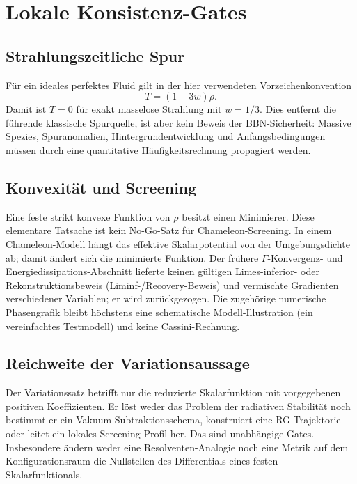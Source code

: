 \documentclass[12pt,a4paper]{article}
\theoremstyle{definition}
\theoremstyle{plain}
\theoremstyle{remark}
\begin{document}
\section{Lokale Konsistenz-Gates}

\subsection{Strahlungszeitliche Spur}\label{sec:BBN}

Für ein ideales perfektes Fluid gilt in der hier verwendeten
Vorzeichenkonvention
\[
 T=(1-3w)\rho .
\]
Damit ist \(T=0\) für exakt masselose Strahlung mit \(w=1/3\). Dies entfernt
die führende klassische Spurquelle, ist aber kein Beweis der BBN-Sicherheit:
Massive Spezies, Spuranomalien, Hintergrundentwicklung und Anfangsbedingungen
müssen durch eine quantitative Häufigkeitsrechnung propagiert werden.

\subsection{Konvexität und Screening}\label{sec:screening-gamma}

Eine feste strikt konvexe Funktion von \(\rho\) besitzt einen Minimierer. Diese
elementare Tatsache ist kein No-Go-Satz für Chameleon-Screening. In einem
Chameleon-Modell hängt das effektive Skalarpotential von der Umgebungsdichte
ab; damit ändert sich die minimierte Funktion. Der frühere
\(\Gamma\)-Konvergenz- und Energiedissipations-Abschnitt lieferte keinen gültigen
Limes-inferior- oder Rekonstruktionsbeweis (Liminf-/Recovery-Beweis) und vermischte Gradienten verschiedener Variablen; er
wird zurückgezogen. Die zugehörige numerische Phasengrafik bleibt höchstens
eine schematische Modell-Illustration (ein vereinfachtes Testmodell) und keine Cassini-Rechnung.

\subsection{Reichweite der Variationsaussage}\label{sec:resolvent-vacuum}

Der Variationssatz betrifft nur die reduzierte Skalarfunktion mit vorgegebenen
positiven Koeffizienten. Er löst weder das Problem der radiativen Stabilität
noch bestimmt er ein Vakuum-Subtraktionsschema, konstruiert eine
RG-Trajektorie oder leitet ein lokales Screening-Profil her. Das sind
unabhängige Gates. Insbesondere ändern weder eine Resolventen-Analogie noch
eine Metrik auf dem Konfigurationsraum die Nullstellen des Differentials eines
festen Skalarfunktionals.
\end{document}

